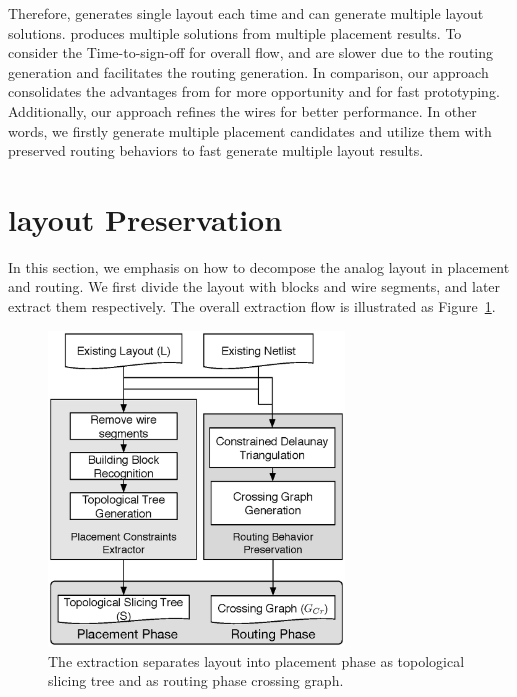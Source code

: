     Therefore, \cite{msc-bhattacharya-tcad06} generates single layout each time and \cite{ALP_YPWeng_iccad2011} can generate multiple layout solutions. \cite{Chin_DMR_ICCAD2013} produces multiple solutions from multiple placement results. To consider the Time-to-sign-off for overall flow, \cite{msc-bhattacharya-tcad06} and \cite{ALP_YPWeng_iccad2011} are slower due to the routing generation and \cite{Chin_DMR_ICCAD2013} facilitates the routing generation. In comparison, our approach consolidates the advantages from \cite{ALP_YPWeng_iccad2011} for more opportunity and \cite{Chin_DMR_ICCAD2013} for fast prototyping. Additionally, our approach refines the wires for better performance. In other words, we firstly generate multiple placement candidates and utilize them with preserved routing behaviors to fast generate multiple layout results. 

  \section{layout Preservation}\label{sec:LayoutPreserv}

    In this section, we emphasis on how to decompose the analog layout in placement and routing. We first divide the layout with blocks and wire segments, and later extract them respectively. The overall extraction flow is illustrated as Figure~\ref{fig:ExtractFlow}. 

    \begin{figure}[t]
        \begin{center}
          \includegraphics[width=0.7\textwidth]{Fig/Chapter4/ExtractFlow.eps}
          \caption{The extraction separates layout into placement phase as topological slicing tree and as routing phase crossing graph.}
          \label{fig:ExtractFlow}
        \end{center}
    \end{figure}
